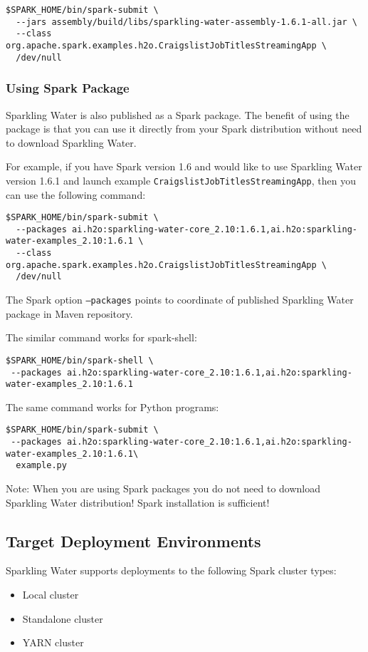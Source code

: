 \begin{lstlisting}[style=Bash]
$SPARK_HOME/bin/spark-submit \
  --jars assembly/build/libs/sparkling-water-assembly-1.6.1-all.jar \
  --class org.apache.spark.examples.h2o.CraigslistJobTitlesStreamingApp \
  /dev/null
\end{lstlisting}

\subsubsection{Using Spark Package}

Sparkling Water is also published as a Spark package. The benefit of using the package is that you can use it directly from your Spark distribution without need to download Sparkling Water.

For example, if you have Spark version 1.6 and would like to use Sparkling Water version 1.6.1 and launch example \texttt{CraigslistJobTitlesStreamingApp}, then you can use the following command:

\begin{lstlisting}[style=Bash]
$SPARK_HOME/bin/spark-submit \
  --packages ai.h2o:sparkling-water-core_2.10:1.6.1,ai.h2o:sparkling-water-examples_2.10:1.6.1 \
  --class org.apache.spark.examples.h2o.CraigslistJobTitlesStreamingApp \
  /dev/null
\end{lstlisting}

The Spark option \texttt{--packages} points to coordinate of published Sparkling Water package in Maven repository.

The similar command works for spark-shell:

\begin{lstlisting}[style=Bash]
$SPARK_HOME/bin/spark-shell \
 --packages ai.h2o:sparkling-water-core_2.10:1.6.1,ai.h2o:sparkling-water-examples_2.10:1.6.1 
\end{lstlisting}

The same command works for Python programs:

\begin{lstlisting}[style=Bash]
$SPARK_HOME/bin/spark-submit \
 --packages ai.h2o:sparkling-water-core_2.10:1.6.1,ai.h2o:sparkling-water-examples_2.10:1.6.1\
  example.py
\end{lstlisting}

Note: When you are using Spark packages you do not need to download Sparkling Water distribution! Spark installation is sufficient!

\subsection{Target Deployment Environments}
Sparkling Water supports deployments to the following Spark cluster types:
\begin{itemize}
	\item{Local cluster}
	\item{Standalone cluster} 
	\item{YARN cluster}
\end{itemize}

